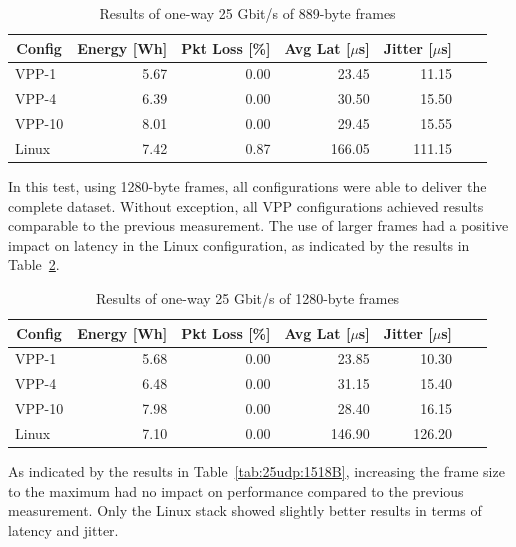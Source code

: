 \begin{table}[h!]
\centering
\caption{Results of one-way 25 Gbit/s of 889-byte frames}
\begin{tabular}{|l|r|r|r|r|r|r|}
\hline
\multicolumn{1}{|c|}{\textbf{Config}} &
\multicolumn{1}{c|}{\textbf{Energy [Wh] }} &
\multicolumn{1}{c|}{\textbf{Pkt Loss [\%]}} &
\multicolumn{1}{c|}{\textbf{Avg Lat [$\mu$s]}} &
\multicolumn{1}{c|}{\textbf{Jitter [$\mu$s]}} \\
\hline 
VPP-1 & 5.67 & 0.00 & 23.45 & 11.15 \\
VPP-4 & 6.39 & 0.00 & 30.50 & 15.50 \\
VPP-10 & 8.01 & 0.00 & 29.45 & 15.55 \\
Linux & 7.42 & 0.87 & 166.05 & 111.15 \\
\hline
\end{tabular}
\label{tab:25udp:889B}
\end{table}

In this test, using 1280-byte frames, all configurations were able to deliver the complete dataset.
Without exception, all VPP configurations achieved results comparable to the previous measurement.
The use of larger frames had a positive impact on latency in the Linux configuration,
as indicated by the results in Table~\ref{tab:25udp:1280B}.

\begin{table}[h!]
\centering
\caption{Results of one-way 25 Gbit/s of 1280-byte frames}
\begin{tabular}{|l|r|r|r|r|r|r|}
\hline
\multicolumn{1}{|c|}{\textbf{Config}} &
\multicolumn{1}{c|}{\textbf{Energy [Wh] }} &
\multicolumn{1}{c|}{\textbf{Pkt Loss [\%]}} &
\multicolumn{1}{c|}{\textbf{Avg Lat [$\mu$s]}} &
\multicolumn{1}{c|}{\textbf{Jitter [$\mu$s]}} \\
\hline 
VPP-1 & 5.68 & 0.00 & 23.85 & 10.30 \\
VPP-4 & 6.48 & 0.00 & 31.15 & 15.40 \\
VPP-10 & 7.98 & 0.00 & 28.40 & 16.15 \\
Linux & 7.10  & 0.00 & 146.90 & 126.20 \\
\hline
\end{tabular}
\label{tab:25udp:1280B}
\end{table}

As indicated by the results in Table~\ref{tab:25udp:1518B}, increasing the frame size to the maximum had no impact on performance compared to the previous measurement.
Only the Linux stack showed slightly better results in terms of latency and jitter.

